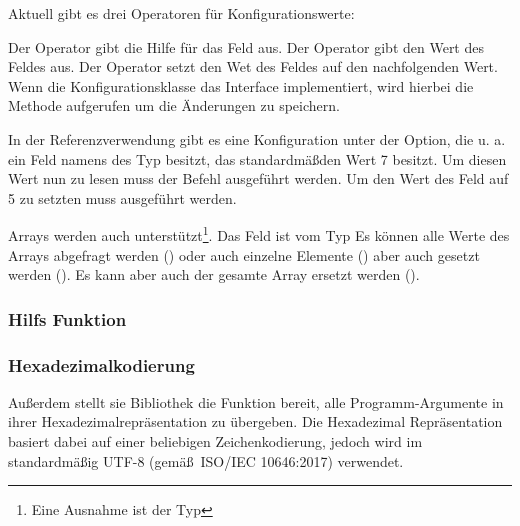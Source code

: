 Aktuell gibt es drei Operatoren für Konfigurationswerte:
\begin{outline}
 \1 Der  Operator gibt die Hilfe für das Feld aus.
 \1 Der  Operator gibt den Wert des Feldes aus.
 \1 Der  Operator setzt den Wet des Feldes auf den nachfolgenden Wert.
 Wenn die Konfigurationsklasse das  Interface implementiert, wird hierbei die  Methode aufgerufen um die \"Anderungen zu speichern.
 \end{outline}

In der Referenzverwendung gibt es eine Konfiguration unter der  Option, die u. a. ein Feld namens  des Typ  besitzt, das standardmä\ss den Wert 7 besitzt.
Um diesen Wert nun zu lesen muss der Befehl  ausgeführt werden.
Um den Wert des Feld auf 5 zu setzten muss  ausgeführt werden.

Arrays werden auch unterstützt\footnote{Eine Ausnahme ist der Typ }.
Das Feld  ist vom Typ 
Es können alle Werte des Arrays abgefragt werden ()
oder auch einzelne Elemente () aber auch gesetzt werden ().
Es kann aber auch der gesamte Array ersetzt werden ().

\subsubsection{Hilfs Funktion}
\subsubsection{Hexadezimalkodierung}\label{Hexadecimalencoding}
Au\ss erdem stellt sie Bibliothek die Funktion bereit, alle Programm-Argumente in ihrer Hexadezimalrepräsentation zu übergeben.
Die Hexadezimal Repräsentation  basiert dabei auf einer beliebigen Zeichenkodierung, jedoch wird im standardmä\ss ig UTF-8 (gemä\ss ~ISO/IEC 10646:2017) verwendet.

